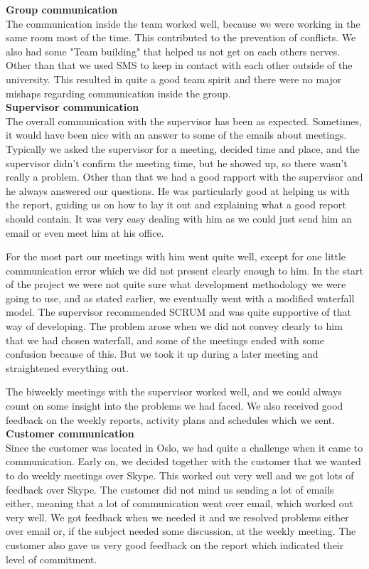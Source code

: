 
\indent \indent \textbf{Group communication} \\
The communication inside the team worked well, because we were working in the same room most of the time. This contributed to the prevention of conflicts. We also had some "Team building" that helped us not get on each others nerves. Other than that we used SMS to keep in contact with each other outside of the university. This resulted in quite a good team spirit and there were no major mishaps regarding communication inside the group.
\\

\textbf{Supervisor communication} \\
The overall communication with the supervisor has been as expected. Sometimes, it would have been nice with an answer to some of the emails about meetings. Typically we asked the supervisor for a meeting, decided time and place, and the supervisor didn't confirm the meeting time, but he showed up, so there wasn't really a problem. Other than that we had a good rapport with the supervisor and he always answered our questions. He was particularly good at helping us with the report, guiding us on how to lay it out and explaining what a good report should contain. It was very easy dealing with him as we could just send him an email or even meet him at his office.

For the most part our meetings with him went quite well, except for one little communication error which we did not present clearly enough to him. In the start of the project we were not quite sure what development methodology we were going to use, and as stated earlier, we eventually went with a modified waterfall model. The supervisor recommended SCRUM and was quite supportive of that way of developing. The problem arose when we did not convey clearly to him that we had chosen waterfall, and some of the meetings ended with some confusion because of this. But we took it up during a later meeting and straightened everything out.

The biweekly meetings with the supervisor worked well, and we could always count on some insight into the problems we had faced. We also received good feedback on the weekly reports, activity plans and schedules which we sent.
\\ 

\textbf{Customer communication} \\
Since the customer was located in Oslo, we had quite a challenge when it came to communication. Early on, we decided together with the customer that we wanted to do weekly meetings over Skype. This worked out very well and we got lots of feedback over Skype. The customer did not mind us sending a lot of emails either, meaning that a lot of communication went over email, which worked out very well. We got feedback when we needed it and we resolved problems either over email or, if the subject needed some discussion, at the weekly meeting. The customer also gave us very good feedback on the report which indicated their level of commitment. 

